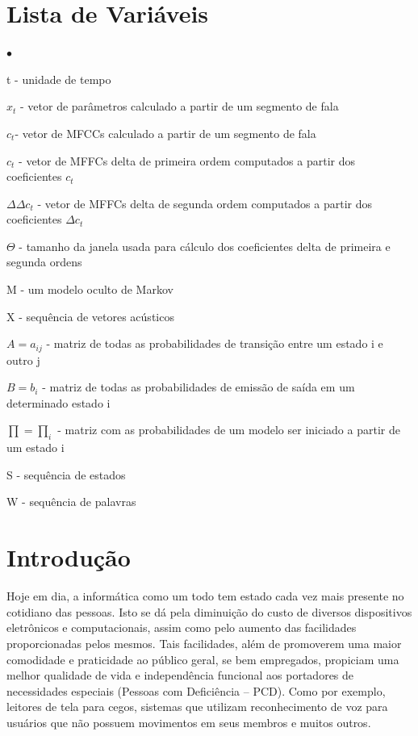 \documentclass[12pt,a4paper,oneside]{report}
\begin{document}
\chapter*{Lista de Variáveis}
\begin{list}{$\bullet$}{}
\item[] t - unidade de tempo
\item[] $x_{t}$ - vetor de parâmetros calculado a partir de um segmento de fala
\item[] $c_{t}$- vetor de MFCCs calculado a partir de um segmento de fala
\item[] $c_{t}$ - vetor de MFFCs delta de primeira ordem computados a partir dos coeficientes $c_{t}$
\item[] $\Delta\Delta c_{t}$ - vetor de MFFCs delta de segunda ordem computados a partir dos coeficientes $\Delta c_{t}$
\item[] $\Theta$ - tamanho da janela usada para cálculo dos coeficientes delta de primeira e segunda ordens
\item[] M - um modelo oculto de Markov
\item[] X - sequência de vetores acústicos
\item[] $A = a_{ij}$ - matriz de todas as probabilidades de transição entre um estado i e outro j
\item[] $B = b_{i}$ - matriz de todas as probabilidades de emissão de saída em um determinado estado i
\item[] $\prod = \prod_{i}$ - matriz com as probabilidades de um modelo ser iniciado a partir de um estado i
\item[] S - sequência de estados
\item[] W - sequência de palavras
\end{list}

\tableofcontents

\listoffigures


\chapter{Introdução}

Hoje em dia, a informática como um todo tem estado cada vez mais presente no cotidiano das pessoas. Isto se dá pela diminuição do custo de diversos dispositivos eletrônicos e computacionais, assim como pelo aumento das facilidades proporcionadas pelos mesmos. Tais facilidades, além de promoverem uma maior comodidade e praticidade ao público geral, se bem empregados, propiciam uma melhor qualidade de vida e independência funcional aos portadores de necessidades especiais (Pessoas com Deficiência – PCD). Como por exemplo, leitores de tela para cegos, sistemas que utilizam reconhecimento de voz para usuários que não possuem movimentos em seus membros e muitos outros.
\end{document}
